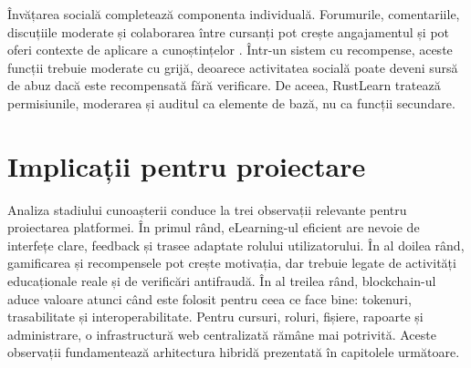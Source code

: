 Învățarea socială completează componenta individuală. Forumurile, comentariile, discuțiile moderate și colaborarea între cursanți pot crește angajamentul și pot oferi contexte de aplicare a cunoștințelor \cite{hrastinski2009diversity,martin2018engagement}. Într-un sistem cu recompense, aceste funcții trebuie moderate cu grijă, deoarece activitatea socială poate deveni sursă de abuz dacă este recompensată fără verificare. De aceea, RustLearn tratează permisiunile, moderarea și auditul ca elemente de bază, nu ca funcții secundare.



\section{Implicații pentru proiectare}
Analiza stadiului cunoașterii conduce la trei observații relevante pentru proiectarea platformei. În primul rând, eLearning-ul eficient are nevoie de interfețe clare, feedback și trasee adaptate rolului utilizatorului. În al doilea rând, gamificarea și recompensele pot crește motivația, dar trebuie legate de activități educaționale reale și de verificări antifraudă. În al treilea rând, blockchain-ul aduce valoare atunci când este folosit pentru ceea ce face bine: tokenuri, trasabilitate și interoperabilitate. Pentru cursuri, roluri, fișiere, rapoarte și administrare, o infrastructură web centralizată rămâne mai potrivită. Aceste observații fundamentează arhitectura hibridă prezentată în capitolele următoare.
